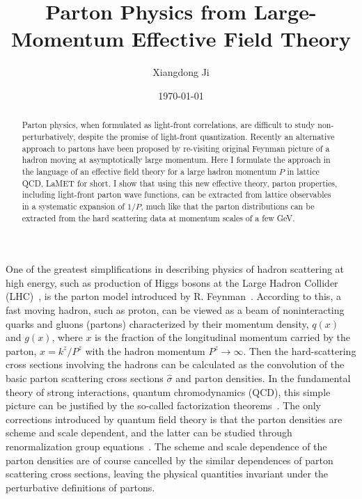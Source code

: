 \documentclass[aps,prd,preprint,tightenlines,superscriptaddress]{revtex4}
\begin{document}
\title{Parton Physics from Large-Momentum Effective Field Theory}
\author{Xiangdong Ji}
\date{\today}
\vspace{0.5in}
\begin{abstract}

Parton physics, when formulated as
light-front correlations, are difficult to study non-perturbatively, despite the promise
of light-front quantization. Recently an alternative approach to partons have been
proposed by re-visiting original Feynman picture of a hadron moving at asymptotically large
momentum. Here I formulate the approach in the language of an effective field theory for a large hadron momentum
$P$ in lattice QCD, LaMET for short. I show that using this new effective theory, parton properties, including 
light-front parton wave functions, can be extracted from lattice observables in a
systematic expansion of $1/P$, much like that the parton distributions can be extracted from the
hard scattering data at momentum scales of a few GeV.


\end{abstract}

\maketitle

One of the greatest simplifications in describing physics of hadron scattering
at high energy, such as production of Higgs bosons at the Large Hadron Collider (LHC)~\cite{science}, 
is the parton model introduced by R. Feynman~\cite{Feynman:1969ej}. According to this, a fast moving hadron, such as proton, can be viewed
as a beam of noninteracting quarks and gluons (partons) characterized by their momentum density,
$q(x)$ and $g(x)$, where $x$ is the fraction of the longitudinal momentum carried by the parton, $x= k^z/P^z$ with
the hadron momentum $P^z \rightarrow \infty$. Then the hard-scattering cross sections involving the hadrons can be
calculated as the convolution of the basic parton scattering cross sections $\hat \sigma$ and parton densities.
In the fundamental theory of strong interactions, quantum chromodynamics (QCD), this simple picture can
be justified by the so-called factorization theorems~\cite{Mueller:1989hs,Sterman:1994ce,Collins:2011zzd}. The only corrections
introduced by quantum field theory
is that the parton densities are scheme and scale dependent, and the latter can be studied through renormalization 
group equations~\cite{Altarelli:1977zs}. The scheme and scale dependence
of the parton densities are of course cancelled by the similar dependences of parton scattering cross sections,
leaving the physical quantities invariant under the perturbative definitions
of partons.
\end{document}
